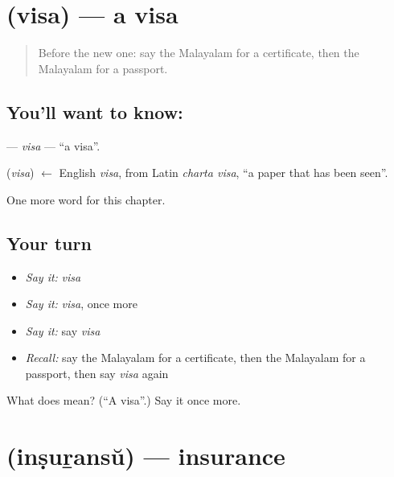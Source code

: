 \section[\texorpdfstring{\ml{വിസ} (visa)}{വിസ (visa)}]{ (visa) — a visa}

\label{lesson:ML-C324-visa}



\begin{quote}
Before the new one: say the Malayalam for a certificate, then the Malayalam for a passport.
\end{quote}

\subsection*{You'll want to know: }
\textbf{} — \emph{visa} — \textquotedblleft{}a visa\textquotedblright{}.

\begin{cousinweb}
\textbf{} (\emph{visa}) $\leftarrow$ English \emph{visa}, from Latin \emph{charta visa}, \textquotedblleft{}a paper that has been seen\textquotedblright{}.
\end{cousinweb}

\begin{grammarlens}[title={What you've built}]
One more word for this chapter.
\end{grammarlens}

\subsection*{Your turn}
\begin{itemize}
\raggedright
  \item \emph{Say it:} \emph{visa}
  \item \emph{Say it:} \emph{visa}, once more
  \item \emph{Say it:} say \emph{visa}
  \item \emph{Recall:} say the Malayalam for a certificate, then the Malayalam for a passport, then say \emph{visa} again
\end{itemize}

\begin{tcolorbox}[breakable,colback=teal!4,colframe=teal!35!black,title={Before you move on}]
What does  mean? (\textquotedblleft{}A visa\textquotedblright{}.) Say it once more.
\end{tcolorbox}
\section[\texorpdfstring{\ml{ഇൻഷുറൻസ്} (inṣuṟansŭ)}{ഇൻഷുറൻസ് (inṣuṟansŭ)}]{ (inṣuṟansŭ) — insurance}

